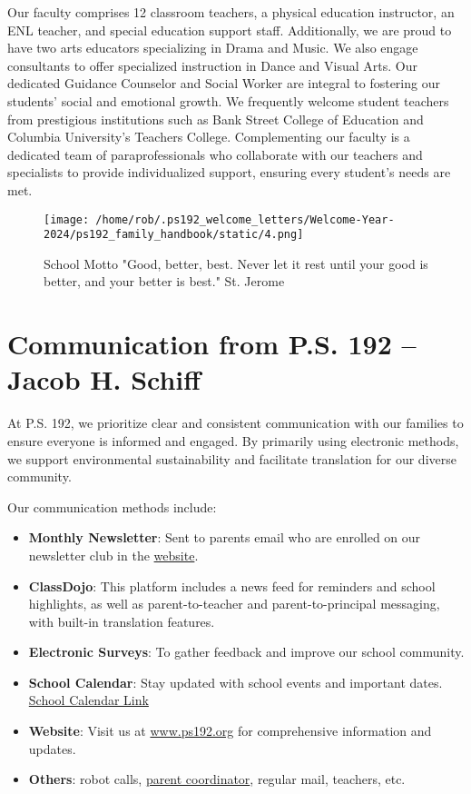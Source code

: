 \documentclass[11pt]{article}
\begin{document}
Our faculty comprises 12 classroom teachers, a physical education instructor, an ENL teacher, and special education support staff. Additionally, we are proud to have two arts educators specializing in Drama and Music. We also engage consultants to offer specialized instruction in Dance and Visual Arts. Our dedicated Guidance Counselor and Social Worker are integral to fostering our students' social and emotional growth. We frequently welcome student teachers from prestigious institutions such as Bank Street College of Education and Columbia University's Teachers College. Complementing our faculty is a dedicated team of paraprofessionals who collaborate with our teachers and specialists to provide individualized support, ensuring every student's needs are met.
\begin{figure}[h]
    \centering
    \texttt{[image: /home/rob/.ps192\_welcome\_letters/Welcome-Year-2024/ps192\_family\_handbook/static/4.png]}
    \caption{School Motto "Good, better, best. Never let it rest until your good is better, and your better is best." St. Jerome}
\end{figure}

\section{Communication from P.S. 192 – Jacob H. Schiff}
\label{sec:orgd2c8395}

At P.S. 192, we prioritize clear and consistent communication with our families to ensure everyone is informed and engaged. By primarily using electronic methods, we support environmental sustainability and facilitate translation for our diverse community.

Our communication methods include:
\begin{itemize}
\item \textbf{\textbf{Monthly Newsletter}}: Sent to parents email who are enrolled on our newsletter club in the \href{https://www.ps192.org}{website}.
\item \textbf{\textbf{ClassDojo}}: This platform includes a news feed for reminders and school highlights, as well as parent-to-teacher and parent-to-principal messaging, with built-in translation features.
\item \textbf{\textbf{Electronic Surveys}}: To gather feedback and improve our school community.
\item \textbf{\textbf{School Calendar}}: Stay updated with school events and important dates. \href{https://www.ps192.org/apps/events/}{School Calendar Link}
\item \textbf{\textbf{Website}}: Visit us at \href{https:www.ps192.org}{www.ps192.org} for comprehensive information and updates.
\item \textbf{\textbf{Others}}: robot calls, \href{https://www.ps192.org/angela}{parent coordinator}, regular mail, teachers, etc.
\end{itemize}
\end{document}
